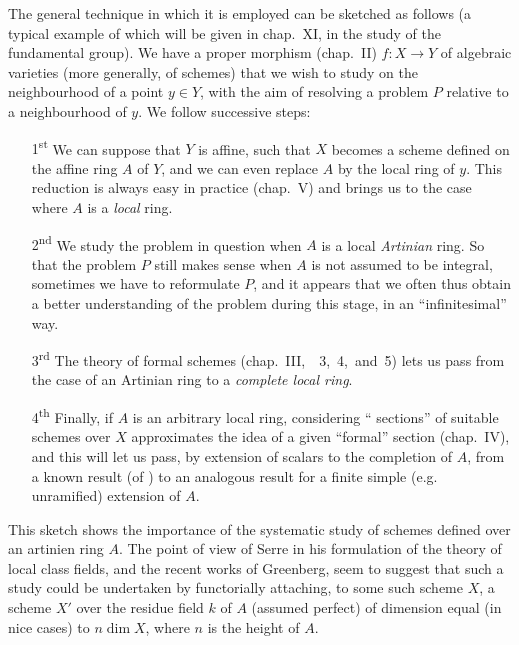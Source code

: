 The general technique in which it is employed can be sketched as follows (a
typical example of which will be given in chap.~XI, in the study of the
fundamental group). We have a proper morphism (chap.~II) $f\colon X\to Y$ of
algebraic varieties (more generally, of schemes) that we wish to study on the
neighbourhood of a point $y\in Y$, with the aim of resolving a problem $P$
relative to a neighbourhood of $y$. We follow successive steps:
\begin{itemize}
  \item[1\textsuperscript{st}]
                 We can suppose that $Y$ is affine, such that $X$ becomes a scheme
                 defined on the affine ring $A$ of $Y$, and we can even replace $A$
                 by the local ring of $y$. This reduction is always easy in practice
                 (chap.~V) and brings us to the case where $A$ is a \emph{local} ring.
  \item[2\textsuperscript{nd}]
                 We study the problem in question when $A$ is a local \emph{Artinian}
                 ring. So that the problem $P$ still makes sense when $A$ is not
                 assumed to be integral, sometimes we have to reformulate $P$, and it
                 appears that we often thus obtain a better understanding of the problem
                 during this stage, in an ``infinitesimal'' way.
  \item[3\textsuperscript{rd}]
                 The theory of formal schemes (chap.~III,~\textsection\textsection~3,~4,~and~5)
                 lets us pass from the case of an Artinian ring to a \emph{complete local ring}.
  \item[4\textsuperscript{th}]
                 Finally, if $A$ is an arbitrary local ring, considering
                 `` sections'' of suitable schemes over $X$
                 approximates the idea of a given ``formal'' section (chap.~IV), and
                 this will let us pass, by extension of scalars to the
                 completion of $A$, from a known result (of \completelyunsure) to an
                 analogous result for a finite simple (e.g. unramified) extension of $A$.
\end{itemize}

This sketch shows the importance of the systematic study of schemes defined over
an artinien ring $A$. The point of view of Serre in his formulation of the
theory of local class fields, and the recent works of Greenberg, seem
to suggest that such a study could be undertaken by functorially attaching, to
some such scheme $X$, a scheme $X'$ over the residue field $k$ of $A$ (assumed
perfect) of dimension equal (in nice cases) to $n\dim X$, where $n$ is
the height of $A$.

